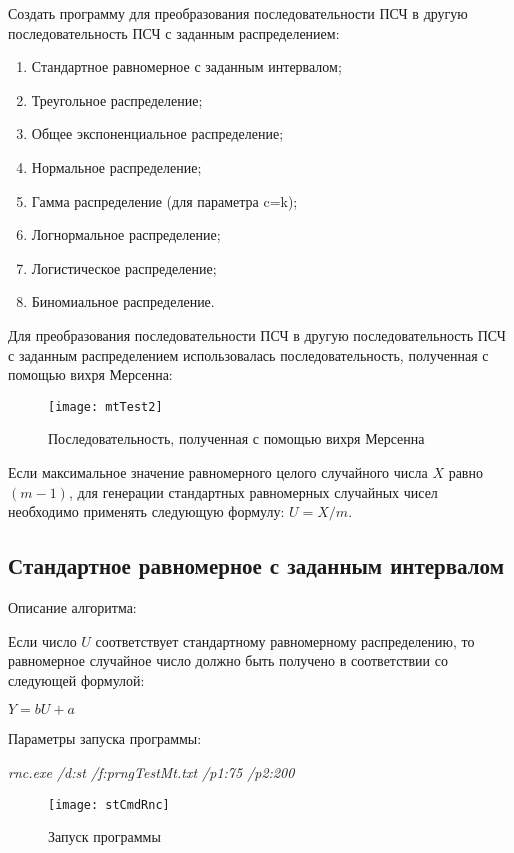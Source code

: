 \documentclass[bachelor, och, coursework]{shiza}
\begin{document}
	Создать программу для преобразования последовательности ПСЧ в другую последовательность
	ПСЧ с заданным распределением:
	
	\begin{enumerate}
		\item Стандартное равномерное с заданным интервалом;
		\item Треугольное распределение;
		\item Общее экспоненциальное распределение;
		\item Нормальное распределение;
		\item Гамма распределение (для параметра c=k);
		\item Логнормальное распределение;
		\item Логистическое распределение;
		\item Биномиальное распределение.
	\end{enumerate}

	Для преобразования последовательности ПСЧ в другую последовательность
	ПСЧ с заданным распределением использовалась последовательность, полученная с помощью вихря Мерсенна:
	
	\begin{figure}[H]
		\centering
		\texttt{[image: mtTest2]}
		\caption{Последовательность, полученная с помощью вихря Мерсенна}
		\label{fig:mtTest2}
	\end{figure}
	
	Если максимальное значение равномерного целого случайного числа $X$
	равно $(m - 1)$, для генерации стандартных равномерных случайных чисел 
	необходимо применять следующую формулу: $U = X / m$.
	
	\subsection{Стандартное равномерное с заданным интервалом}
	
	Описание алгоритма:
	
	Если число $U$ соответствует стандартному равномерному распределению, то равномерное случайное число должно быть получено в соответствии со следующей формулой:
 
	\begin{center}
		$Y = bU + a$
	\end{center}
	
	Параметры запуска программы:
	
	\textit{rnc.exe /d:st /f:prngTestMt.txt /p1:75 /p2:200}

	
	\begin{figure}[H]
		\centering
		\texttt{[image: stCmdRnc]}
		\caption{Запуск программы}
		\label{fig:stCmdRnc}
	\end{figure}
	
\end{document}
